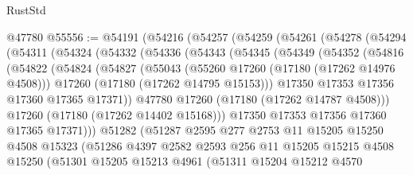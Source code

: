 \begin{lexlean}{RustStd}
\begin{coremodule}
    @47780
@55556 := @54191
    (@54216
      (@54257
        (@54259
          (@54261
            (@54278
              (@54294
                (@54311
                  (@54324
                    (@54332
                      (@54336
                        (@54343
                          (@54345
                            (@54349
                              (@54352
                                (@54816
                                  (@54822
                                    (@54824
                                      (@54827
                                        (@55043
                                          (@55260 @17260 (@17180 (@17262 @14976 @4508)))
                                          @17260
                                          (@17180 (@17262 @14795 @15153)))
                                        @17350
                                        @17353
                                        @17356
                                        @17360
                                        @17365
                                        @17371))
                                    @47780
                                    @17260
                                    (@17180 (@17262 @14787 @4508)))
                                  @17260
                                  (@17180 (@17262 @14402 @15168)))
                                @17350
                                @17353
                                @17356
                                @17360
                                @17365
                                @17371)))
                          @51282
                          (@51287
                            @2595
                            @277
                            @2753
                            @11
                            @15205
                            @15250
                            @4508
                            @15323
                            (@51286
                              @4397
                              @2582
                              @2593
                              @256
                              @11
                              @15205
                              @15215
                              @4508
                              @15250
                              (@51301
                                @15205
                                @15213
                                @4961
                                (@51311
                                  @15204
                                  @15212
                                  @4570

\end{coremodule}
\end{lexlean}
